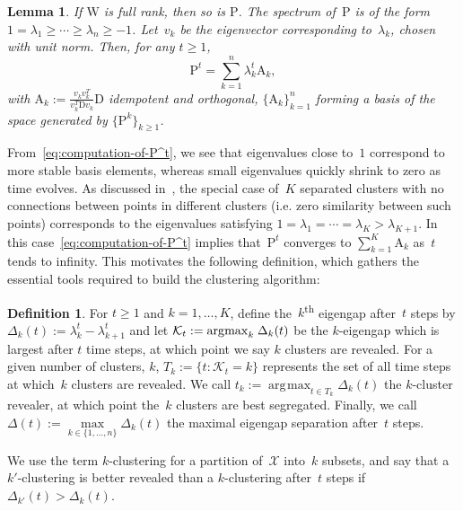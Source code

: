 \documentclass{amsart}[11pt]
\numberwithin{equation}{section}
\newtheorem{lemma}[theorem]{Lemma}
\theoremstyle{definition}
\newtheorem{definition}[theorem]{Definition}
\newcommand{\Kk}{\mathcal{K}}
\newcommand{\Xx}{\mathcal{X}}
\newcommand{\Df}{\mathrm{D}}
\newcommand{\Af}{\mathrm{A}}
\newcommand{\Wf}{\mathrm{W}}
\newcommand{\Pf}{\mathrm{P}}
\DeclareMathOperator*{\argmax}{\arg\!\max}
\begin{document}
\begin{lemma}\label{lem:properties-of-P}
If $\Wf$ is full rank, then so is $\Pf$.
The spectrum of~$\Pf$ is of the form $1=\lambda_1\geq \cdots \geq \lambda_n\geq -1$.
Let~$v_k$ be the eigenvector corresponding to~$\lambda_k$, chosen with unit norm.
Then, for any $t \geq 1$,
\begin{equation}\label{eq:computation-of-P^t}
        \Pf^{t} = \sum_{k = 1}^{n} \lambda_{k}^{t} \Af_k,
    \end{equation}
with $\Af_k := \frac{v_k v_k^{T}}{v_k^{T} \Df v_k}\Df$ idempotent and orthogonal,
$\{\Af_k\}_{k = 1}^{n}$ forming a basis of the space generated by
$\{\Pf^k\}_{k\geq 1}$.
\end{lemma}

From~\eqref{eq:computation-of-P^t}, we see that eigenvalues close to~$1$ correspond
to more stable basis elements, whereas small eigenvalues quickly shrink to zero as time evolves.
As discussed in~\cite[Assumption A1]{Ng01}, 
the special case of~$K$ separated clusters with no connections between points in different clusters 
(i.e. zero similarity between such points) corresponds to the eigenvalues satisfying 
$1=\lambda_1 = \cdots = \lambda_K>\lambda_{K+1}$.
In this case~\eqref{eq:computation-of-P^t} implies that~$\Pf^t$ converges to $\sum_{k = 1}^{K} \Af_k$
as~$t$ tends to infinity.
This motivates the following definition, which gathers the essential tools required to build the clustering algorithm:

\begin{definition}
\label{def:previous-steps-to-best-reveal}
For $t\geq 1$ and $k=1, \ldots, K$, define the~$k$\textsuperscript{th} eigengap after~$t$ steps by $\Delta_k(t) := \lambda_k^t - \lambda_{k+1}^t$ and
let $\Kk_t := \argmax_k \hspace{0.1em} \Delta_k(t)$ be the $k$-eigengap which is largest after $t$ time steps, at which point we say $k$ clusters are revealed.
For a given number of clusters, $k$, $T_k:=\{t:\Kk_t = k\}$ represents the set of all time steps at which~$k$ clusters are revealed. We call 
$t_k := \argmax_{t\in T_k}\Delta_k(t)$ the $k$-cluster revealer, at which point the~$k$ clusters are best segregated.
Finally, we call
$\Delta(t) := \max\limits_{k \in \{1, \ldots, n\}} \Delta_k(t)$ the maximal eigengap separation after~$t$ steps.
\end{definition}

We use the term $k$-clustering for a partition of~$\Xx$ into~$k$ subsets,
and say that a $k'$-clustering is better revealed than a $k$-clustering after~$t$ steps if $\Delta_{k'}(t) > \Delta_k(t)$.
\end{document}
